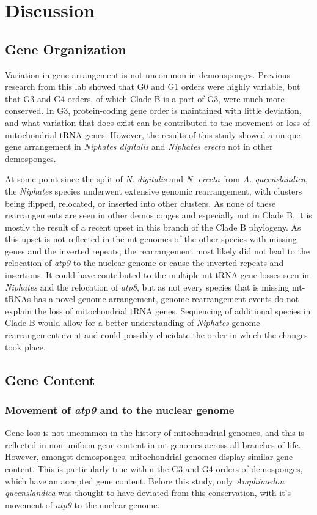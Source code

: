 \documentclass[../main.tex]{subfiles}
\begin{document}
\section{Discussion}
\subsection{Gene Organization}

Variation in gene arrangement is not uncommon in demonsponges. Previous research from this lab showed that G0 and G1 orders were highly variable, but that G3 and G4 orders, of which Clade B is a part of G3, were much more conserved. In G3, protein-coding gene order is maintained with little deviation, and what variation that does exist can be contributed to the movement or loss of mitochondrial tRNA genes. However, the results of this study showed a unique gene arrangement in \emph{Niphates digitalis} and \emph{Niphates erecta} not in other demosponges.

At some point since the split of \emph{N. digitalis} and \emph{N. erecta} from \emph{A. queenslandica}, the \emph{Niphates} species underwent extensive genomic rearrangement, with clusters being flipped, relocated, or inserted into other clusters. As none of these rearrangements are seen in other demosponges and especially not in Clade B, it is mostly the result of a recent upset in this branch of the Clade B phylogeny. As this upset is not reflected in the mt-genomes of the other species with missing genes and the inverted repeats, the rearrangement most likely did not lead to the relocation of \emph{atp9} to the nuclear genome or cause the inverted repeats and insertions. It could have contributed to the multiple mt-tRNA gene losses seen in \emph{Niphates} and the relocation of \emph{atp8}, but as not every species that is missing mt-tRNAs has a novel genome arrangement, genome rearrangement events do not explain the loss of mitochondrial tRNA genes. Sequencing of additional species in Clade B would allow for a better understanding of \emph{Niphates} genome rearrangement event and could possibly elucidate the order in which the changes took place.

\subsection{Gene Content}
\subsubsection{Movement of \emph{atp9} and to the nuclear genome}
Gene loss is not uncommon in the history of mitochondrial genomes, and this is reflected in non-uniform gene content in mt-genomes across all branches of life. However, amongst demosponges, mitochondrial genomes display similar gene content. This is particularly true within the G3 and G4 orders of demosponges, which have an accepted gene content. Before this study, only \emph{Amphimedon queenslandica} was thought to have deviated from this conservation, with it's movement of \emph{atp9} to the nuclear genome.
\end{document}
